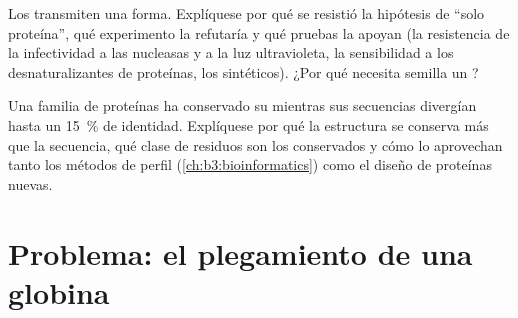 \begin{exercise}[$\star\star\star$]\label{exo:b3:structural-biology:11}
Los  transmiten una forma. Explíquese por qué se resistió la
hipótesis de ``solo proteína'', qué experimento la refutaría y qué
pruebas la apoyan (la resistencia de la infectividad a las nucleasas y a
la luz ultravioleta, la sensibilidad a los desnaturalizantes de
proteínas, los  sintéticos). ¿Por qué necesita semilla un ?
\end{exercise}

\begin{exercise}[$\star\star\star$]\label{exo:b3:structural-biology:12}
Una familia de proteínas ha conservado su  mientras sus
secuencias divergían hasta un \qty{15}{\%} de identidad. Explíquese por
qué la estructura se conserva más que la secuencia, qué clase de residuos
son los conservados y cómo lo aprovechan tanto los métodos de perfil
(\cref{ch:b3:bioinformatics}) como el diseño de proteínas nuevas.
\end{exercise}

\section{Problema: el plegamiento de una globina}

